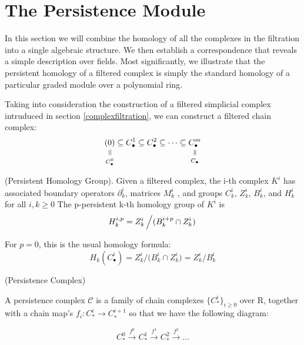\documentclass[11pt,a4paper]{report}
\newcommand{\verteq}{\rotatebox{90}{$\,=$}}
\newcommand{\equalto}[2]{\underset{\scriptstyle\overset{\mkern4mu\verteq}{#2}}{#1}}
\begin{document}
              
              
              
              
              \section{The Persistence Module}
              
              In this section we will combine the homology of all the complexes in the filtration
            into a single algebraic structure. We then establish a correspondence that reveals a simple
            description over fields. Most significantly, we illustrate that the persistent homology of
            a filtered complex is simply the standard homology of a particular graded module over
            a polynomial ring. 
              
              Taking into consideration the construction of a filtered simplicial complex intruduced in section \ref{complexfiltration}, we can construct a filtered chain complex: \\
              \[
                    \equalto{(0)}{C_\bullet^0} \subseteq C_\bullet^1 \subseteq C_\bullet^2 \subseteq \cdots \subseteq \equalto{C_\bullet^m}{C_\bullet}
              \]
             
              \begin{defn} (Persistent Homology Group). Given a filtered complex, the i-th complex $K^i$ has associated boundary operators 
                $\partial^i_k$, matrices $M^i_k$ , and groups $C^i_k$, $Z^i_k$, $B^i_k$, and $H^i_k$ for all $i, k \geq 0$
                The p-persistent k-th homology group of $K^i$ is 
                        \[
                        H_k^{i, p} = Z_k^i \left/ (B_k^{i+p} \cap Z_k^i) \right.
            \]
            \end{defn}
              
              For $p = 0$, this is the usual homology formula:
               \[ H_k(C_\bullet^i) = Z_k^i / {(B_k^i \cap Z_k^i}) = Z_k^i / B_k^i \]
             \begin{defn} (Persistence Complex)
             
             A persistence complex $\mathcal{C}$ is a family of chain complexes $\{C_*^i\}_{i \geq 0}$ over R, together with a chain map's $f_i: C_*^i \rightarrow C_*^{i+1}$ so that we have the following diagram:
             
             \[
               C_*^0 \xrightarrow{f^0} C_*^1 \xrightarrow{f^1} C_*^2 \xrightarrow{f^2} \dots
             \]

              
             \end{defn}
\end{document}
